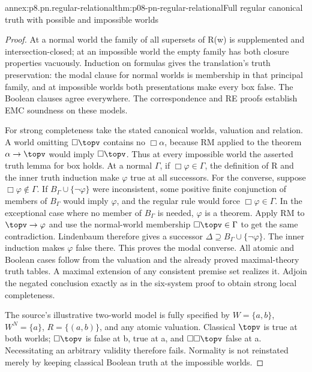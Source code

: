 \begin{annexitem}{annex:p8.pn.regular-relational}{thm:p08-pn-regular-relational}{Full regular canonical truth with possible and impossible worlds}
\begin{proof}
At a normal world the family of all supersets of R(w) is
supplemented and intersection-closed; at an impossible world the
empty family has both closure properties vacuously. Induction
on formulas gives the translation's truth preservation: the modal
clause for normal worlds is membership in that principal family,
and at impossible worlds both presentations make every box false.
The Boolean clauses agree everywhere. The correspondence and RE
proofs establish EMC soundness on these models.

For strong completeness take the stated canonical worlds,
valuation and relation. A world omitting \(\Box\topv\)
contains no \(\Box\alpha\), because RM applied to the theorem
\(\alpha\to\topv\) would imply \(\Box\topv\). Thus at
every impossible world the asserted truth lemma for box holds.
At a normal \(\Gamma\), if \(\Box\varphi\in\Gamma\),
the definition of R and the inner truth induction make \(\varphi\)
true at all successors. For the converse, suppose
\(\Box\varphi\notin\Gamma\). If
\(B_\Gamma\cup\{\neg\varphi\}\) were inconsistent,
some positive finite conjunction of members of \(B_\Gamma\)
would imply \(\varphi\), and the regular rule would force
\(\Box\varphi\in\Gamma\). In the exceptional case where
no member of \(B_\Gamma\) is needed, \(\varphi\) is a
theorem. Apply RM to \(\topv\to\varphi\) and use the
normal-world membership \(\Box\topv\in\Gamma\) to get
the same contradiction. Lindenbaum therefore gives a successor
\(\Delta\supseteq B_\Gamma\cup\{\neg\varphi\}\).
The inner induction makes \(\varphi\) false there. This proves
the modal converse. All atomic and Boolean cases follow from
the valuation and the already proved maximal-theory truth tables.
A maximal extension of any consistent premise set realizes it.
Adjoin the negated conclusion exactly as in the six-system proof
to obtain strong local completeness.

The source's illustrative two-world model is fully specified by
\(W=\{a,b\}\), \(W^N=\{a\}\), \(R=\{(a,b)\}\),
and any atomic valuation. Classical \(\topv\) is true at both
worlds; \(\Box\topv\) is false at b, true at a, and
\(\Box\Box\topv\) false at a. Necessitating an arbitrary
validity therefore fails. Normality is not reinstated merely by
keeping classical Boolean truth at the impossible worlds.
\end{proof}
\end{annexitem}

